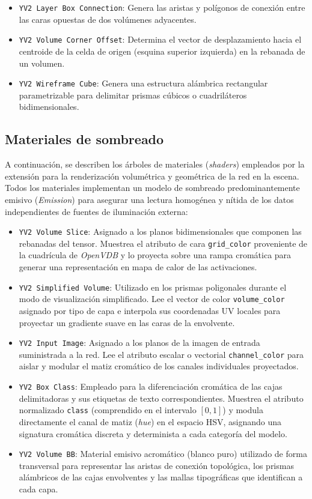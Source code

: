 \begin{itemize}
    \item \texttt{YV2 Layer Box Connection}: Genera las aristas y polígonos de conexión entre las caras opuestas de dos volúmenes adyacentes.
    \item \texttt{YV2 Volume Corner Offset}: Determina el vector de desplazamiento hacia el centroide de la celda de origen 
    (esquina superior izquierda) en la rebanada de un volumen.
    \item \texttt{YV2 Wireframe Cube}: Genera una estructura alámbrica rectangular parametrizable para delimitar prismas cúbicos 
    o cuadriláteros bidimensionales.
\end{itemize}

\subsection{Materiales de sombreado}
A continuación, se describen los árboles de materiales (\textit{shaders}) empleados por la extensión para la renderización 
volumétrica y geométrica de la red en la escena. Todos los materiales implementan un modelo de sombreado predominantemente emisivo 
(\textit{Emission}) para asegurar una lectura homogénea y nítida de los datos independientes de fuentes de iluminación externa:

\begin{itemize}
    \item \texttt{YV2 Volume Slice}: Asignado a los planos bidimensionales que componen las rebanadas del tensor. Muestrea el atributo de cara 
    \texttt{grid\_color} proveniente de la cuadrícula de \textit{OpenVDB} y lo proyecta sobre una rampa cromática para generar una 
    representación en mapa de calor de las activaciones.
    \item \texttt{YV2 Simplified Volume}: Utilizado en los prismas poligonales durante el modo de visualización simplificado. Lee el vector 
    de color \texttt{volume\_color} asignado por tipo de capa e interpola sus coordenadas UV locales para proyectar un gradiente suave en las caras de la envolvente.
    \item \texttt{YV2 Input Image}: Asignado a los planos de la imagen de entrada suministrada a la red. Lee el atributo escalar o vectorial 
    \texttt{channel\_color} para aislar y modular el matiz cromático de los canales individuales proyectados.
    \item \texttt{YV2 Box Class}: Empleado para la diferenciación cromática de las cajas delimitadoras y sus etiquetas de texto 
    correspondientes. Muestrea el atributo normalizado \texttt{class} (comprendido en el intervalo $[0, 1]$) y modula directamente 
    el canal de matiz (\textit{hue}) en el espacio HSV, asignando una signatura cromática discreta y determinista a cada categoría del modelo.
    \item \texttt{YV2 Volume BB}: Material emisivo acromático (blanco puro) utilizado de forma transversal para representar las aristas 
    de conexión topológica, los prismas alámbricos de las cajas envolventes y las mallas tipográficas que identifican a cada capa.
\end{itemize}

